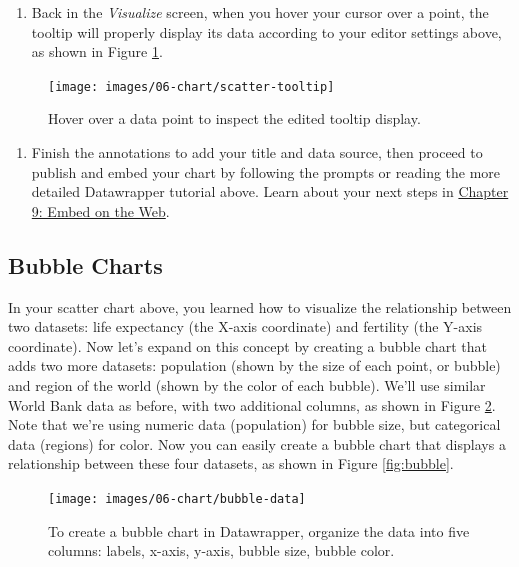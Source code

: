 \documentclass[
  english,
]{book}
\providecommand{\tightlist}{%
  \setlength{\itemsep}{0pt}\setlength{\parskip}{0pt}}
\begin{document}
\begin{enumerate}
\def\labelenumi{\arabic{enumi}.}
\setcounter{enumi}{6}
\tightlist
\item
  Back in the \emph{Visualize} screen, when you hover your cursor over a point, the tooltip will properly display its data according to your editor settings above, as shown in Figure \ref{fig:scatter-tooltip}.
\end{enumerate}



\begin{figure}
\texttt{[image: images/06-chart/scatter-tooltip]} \caption{Hover over a data point to inspect the edited tooltip display.}\label{fig:scatter-tooltip}
\end{figure}

\begin{enumerate}
\def\labelenumi{\arabic{enumi}.}
\setcounter{enumi}{7}
\tightlist
\item
  Finish the annotations to add your title and data source, then proceed to publish and embed your chart by following the prompts or reading the more detailed Datawrapper tutorial above. Learn about your next steps in \href{embed.html}{Chapter 9: Embed on the Web}.
\end{enumerate}

\hypertarget{bubble-charts}{%
\subsection*{Bubble Charts}\label{bubble-charts}}

In your scatter chart above, you learned how to visualize the relationship between two datasets: life expectancy (the X-axis coordinate) and fertility (the Y-axis coordinate). Now let's expand on this concept by creating a bubble chart that adds two more datasets: population (shown by the size of each point, or bubble) and region of the world (shown by the color of each bubble). We'll use similar World Bank data as before, with two additional columns, as shown in Figure \ref{fig:bubble-data}. Note that we're using numeric data (population) for bubble size, but categorical data (regions) for color. Now you can easily create a bubble chart that displays a relationship between these four datasets, as shown in Figure \ref{fig:bubble}.



\begin{figure}
\texttt{[image: images/06-chart/bubble-data]} \caption{To create a bubble chart in Datawrapper, organize the data into five columns: labels, x-axis, y-axis, bubble size, bubble color.}\label{fig:bubble-data}
\end{figure}
\end{document}
